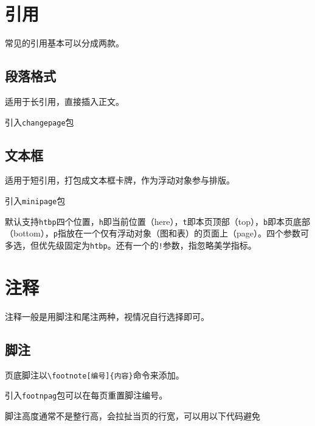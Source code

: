 \documentclass[10pt,openany]{book}
\begin{document}
\chapter{引用}

常见的引用基本可以分成两款。

\section{段落格式}

适用于长引用，直接插入正文。

引入\texttt{changepage}包



\section{文本框}

适用于短引用，打包成文本框卡牌，作为浮动对象参与排版。

引入\texttt{minipage}包



默认支持\texttt{htbp}四个位置，\texttt{h}即当前位置（here），\texttt{t}即本页顶部（top），\texttt{b}即本页底部（bottom），\texttt{p}指放在一个仅有浮动对象（图和表）的页面上（page）。四个参数可多选，但优先级固定为\texttt{htbp}。还有一个的\texttt{!}参数，指忽略美学指标。

\chapter{注释}

注释一般是用脚注和尾注两种，视情况自行选择即可。

\section{脚注}

页底脚注以\texttt{\textbackslash{}footnote[编号]\{内容\}}命令来添加。



引入\texttt{footnpag}包可以在每页重置脚注编号。



脚注高度通常不是整行高，会拉扯当页的行宽，可以用以下代码避免


\end{document}
